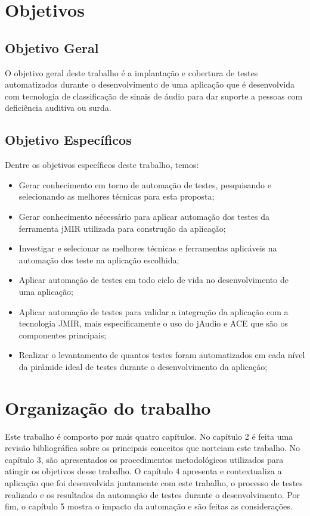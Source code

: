\section{Objetivos} 

\subsection{Objetivo Geral}

O objetivo geral deste trabalho é a implantação e cobertura de testes automatizados durante o desenvolvimento de uma aplicação que é desenvolvida com tecnologia de classificação de sinais de áudio para dar suporte a pessoas com deficiência auditiva ou surda.

\subsection{Objetivo Específicos}
Dentre os objetivos específicos deste trabalho, temos:  
\begin{itemize}
	\item Gerar conhecimento em torno de automação de testes, pesquisando e selecionando as melhores técnicas para esta proposta;
	\item Gerar conhecimento nécessário para aplicar automação dos testes da ferramenta jMIR utilizada para construção da aplicação;
	\item Investigar e selecionar as melhores técnicas e ferramentas aplicáveis na automação dos teste na aplicação escolhida;
	\item Aplicar automação de testes em todo ciclo de vida no desenvolvimento de uma aplicação;	
	\item Aplicar automação de testes para validar a integração da aplicação com a tecnologia JMIR, mais especificamente o uso do jAudio e ACE que são os componentes principais;
	\item Realizar o levantamento de quantos testes foram automatizados em cada nível da pirâmide ideal de testes durante o desenvolvimento da aplicação;
\end{itemize}

\section{Organização do trabalho}

Este trabalho é composto por mais quatro capítulos. No capítulo 2 é feita uma revisão bibliográfica sobre os principais conceitos que norteiam este trabalho. No capítulo 3, são apresentados os procedimentos metodológicos utilizados para atingir os objetivos desse trabalho. O capítulo 4 apresenta e contextualiza a aplicação que foi desenvolvida juntamente com este trabalho, o processo de testes realizado e os resultados da automação de testes durante o desenvolvimento. Por fim, o capítulo 5 mostra o impacto da automação e são feitas as considerações.